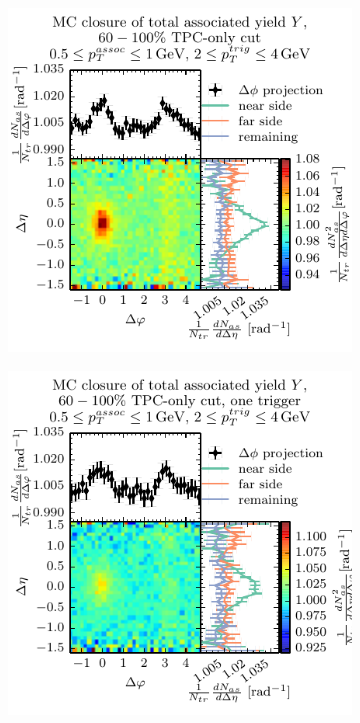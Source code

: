 \begin{figure}[htbp]
  \centering
  \begin{subfigure}{0.5\textwidth}
    \includegraphics[]{figures/closure_TPC.pdf}
  \end{subfigure}%
  \begin{subfigure}{0.5\textwidth}
    \includegraphics[]{figures/closure_TPC_one_mc_trigger.pdf}
  \end{subfigure}

\end{figure}
